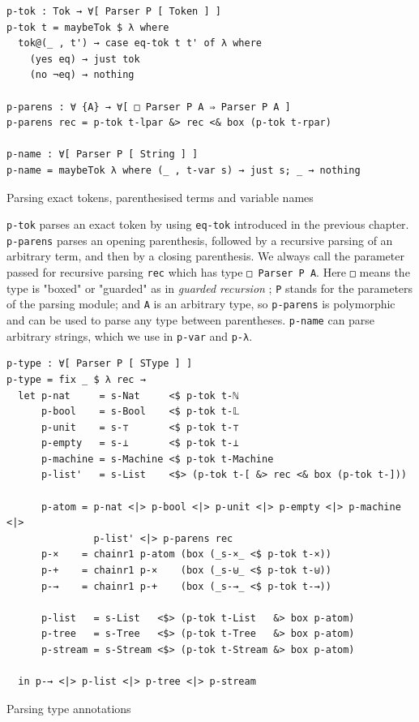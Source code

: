 \begin{listing}[H]
\begin{verbatim}
p-tok : Tok → ∀[ Parser P [ Token ] ]
p-tok t = maybeTok $ λ where
  tok@(_ , t') → case eq-tok t t' of λ where
    (yes eq) → just tok
    (no ¬eq) → nothing

p-parens : ∀ {A} → ∀[ □ Parser P A ⇒ Parser P A ]
p-parens rec = p-tok t-lpar &> rec <& box (p-tok t-rpar)

p-name : ∀[ Parser P [ String ] ]
p-name = maybeTok λ where (_ , t-var s) → just s; _ → nothing
\end{verbatim}
\caption{Parsing exact tokens, parenthesised terms and variable names}
\label{code:parse-basic-parsers}
\end{listing}

\verb$p-tok$ parses an exact token by using \verb$eq-tok$ introduced in the previous chapter. \verb$p-parens$ parses an opening parenthesis, followed by a recursive parsing of an arbitrary term, and then by a closing parenthesis. We always call the parameter passed for recursive parsing \verb$rec$ which has type \verb$□ Parser P A$. Here \verb$□$ means the type is "boxed" or "guarded" as in \textit{guarded recursion} \cite{veltri2019guarded}; \verb$P$ stands for the parameters of the parsing module; and \verb$A$ is an arbitrary type, so \verb$p-parens$ is polymorphic and can be used to parse any type between parentheses. \verb$p-name$ can parse arbitrary strings, which we use in \verb$p-var$ and \verb$p-λ$.

\begin{listing}[H]
\begin{verbatim}
p-type : ∀[ Parser P [ SType ] ]
p-type = fix _ $ λ rec →
  let p-nat     = s-Nat     <$ p-tok t-ℕ
      p-bool    = s-Bool    <$ p-tok t-𝕃
      p-unit    = s-⊤       <$ p-tok t-⊤
      p-empty   = s-⊥       <$ p-tok t-⊥
      p-machine = s-Machine <$ p-tok t-Machine
      p-list'   = s-List    <$> (p-tok t-[ &> rec <& box (p-tok t-]))

      p-atom = p-nat <|> p-bool <|> p-unit <|> p-empty <|> p-machine <|>
               p-list' <|> p-parens rec
      p-×    = chainr1 p-atom (box (_s-×_ <$ p-tok t-×))
      p-+    = chainr1 p-×    (box (_s-⊎_ <$ p-tok t-⊎))
      p-→    = chainr1 p-+    (box (_s-→_ <$ p-tok t-→))

      p-list   = s-List   <$> (p-tok t-List   &> box p-atom)
      p-tree   = s-Tree   <$> (p-tok t-Tree   &> box p-atom)
      p-stream = s-Stream <$> (p-tok t-Stream &> box p-atom)

  in p-→ <|> p-list <|> p-tree <|> p-stream
\end{verbatim}
\caption{Parsing type annotations}
\label{code:parse-p-type}
\end{listing}

